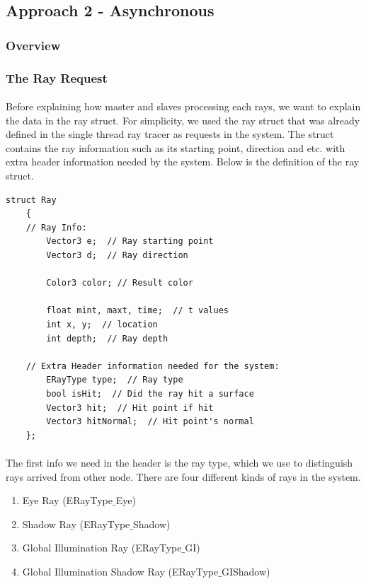 \documentclass[a4paper, oneside, 10pt]{article}
\begin{document}
\subsection{Approach 2 - Asynchronous}
\subsubsection{Overview}

\subsubsection{The Ray Request}
\paragraph{} Before explaining how master and slaves processing each rays, we want to explain the data in the ray struct.  For simplicity, we used the ray struct that was already defined in the single thread ray tracer as requests in the system.  The struct contains the ray information such as its starting point, direction and etc. with extra header information needed by the system.  Below is the definition of the ray struct.
\lstset{language=C++} 
\begin{lstlisting}[frame=single] 
struct Ray
    {
    // Ray Info:
        Vector3 e;  // Ray starting point
        Vector3 d;  // Ray direction
 
        Color3 color; // Result color
        
        float mint, maxt, time;  // t values
        int x, y;  // location
        int depth;  // Ray depth
        
    // Extra Header information needed for the system:
        ERayType type;  // Ray type
        bool isHit;  // Did the ray hit a surface
        Vector3 hit;  // Hit point if hit
        Vector3 hitNormal;  // Hit point's normal
    }; 
\end{lstlisting}
\paragraph{} The first info we need in the header is the ray type, which we use to distinguish rays arrived from other node. There are four different kinds of rays in the system.
\begin{enumerate}
\item Eye Ray (ERayType$\_$Eye)
\item Shadow Ray (ERayType$\_$Shadow)
\item Global Illumination Ray (ERayType$\_$GI)
\item Global Illumination Shadow Ray (ERayType$\_$GIShadow)
\end{enumerate}
\end{document}
